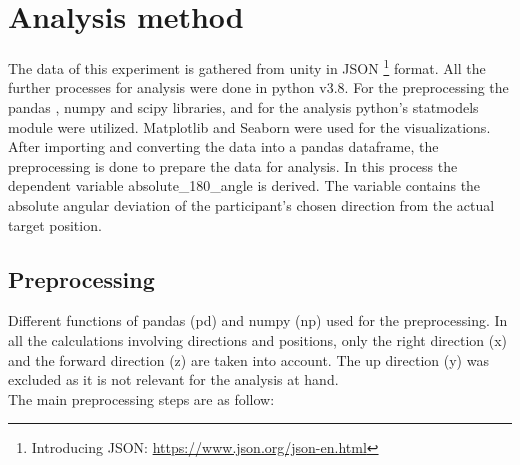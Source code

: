 

\section{Analysis method}

The data of this experiment is gathered from unity in JSON \footnote{Introducing JSON: \href{https://www.json.org/json-en.html}{https://www.json.org/json-en.html}} format. All the further processes for analysis were done in python \autocite{10.5555/1593511} v3.8. For the preprocessing the pandas \autocite{reback2022pandas, mckinney-proc-scipy-2010}, numpy \autocite{harris2020array} and scipy \autocite{2020SciPy-NMeth} libraries, and for the analysis python's statmodels \autocite{seabold2010statsmodels} module were utilized. Matplotlib \autocite{Hunter:2007} and Seaborn \autocite{Waskom2021} were used for the visualizations.\\

After importing and converting the data into a pandas dataframe, the preprocessing is done to prepare the data for analysis. In this process the dependent variable {\emphasize absolute\_180\_angle} is derived. The variable contains the absolute angular deviation of the participant's chosen direction from the actual target position. 

\subsection{Preprocessing}

Different functions of pandas {\emphasize (pd)} and numpy {\emphasize (np)} used for the preprocessing. In all the calculations involving directions and positions, only the right direction (x) and the forward direction (z) are taken into account. The up direction (y) was excluded as it is not relevant for the analysis at hand. \\

The main preprocessing steps are as follow:

